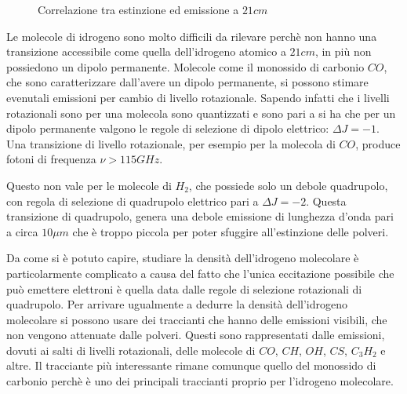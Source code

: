 \begin{figure}
		\centering
		\caption{Correlazione tra estinzione ed emissione a $21cm$}
		\label{CORR:EST:EL}
\end{figure}

Le molecole di idrogeno sono molto difficili da rilevare perch\`e non hanno una transizione accessibile come quella dell'idrogeno atomico a $21cm$, in pi\`u non possiedono un dipolo permanente. Molecole come il monossido di carbonio $CO$, che sono caratterizzare dall'avere un dipolo permanente, si possono stimare evenutali emissioni per cambio di livello rotazionale. Sapendo infatti che i livelli rotazionali sono per una molecola sono quantizzati e sono pari a
si ha che per un dipolo permanente valgono le regole di selezione di dipolo elettrico: $\Delta J = -1$. Una transizione di livello rotazionale, per esempio per la molecola di $CO$, produce fotoni di frequenza $\nu > 115GHz$.

Questo non vale per le molecole di $H_2$, che possiede solo un debole quadrupolo, con regola di selezione di quadrupolo elettrico pari a $\Delta J = -2$. Questa transizione di quadrupolo, genera una debole emissione di lunghezza d'onda pari a circa $10\mu m$ che \`e troppo piccola per poter sfuggire all'estinzione delle polveri.

Da come si \`e potuto capire, studiare la densit\`a dell'idrogeno molecolare \`e particolarmente complicato a causa del fatto che l'unica eccitazione possibile che pu\`o emettere elettroni \`e quella data dalle regole di selezione rotazionali di quadrupolo. Per arrivare ugualmente a dedurre la densit\`a dell'idrogeno molecolare si possono usare dei traccianti che hanno delle emissioni visibili, che non vengono attenuate dalle polveri. Questi sono rappresentati dalle emissioni, dovuti ai salti di livelli rotazionali, delle molecole di $CO$, $CH$, $OH$, $CS$, $C_3H_2$ e altre. Il tracciante pi\`u interessante rimane comunque quello del monossido di carbonio perch\`e \`e uno dei principali traccianti proprio per l'idrogeno molecolare.

